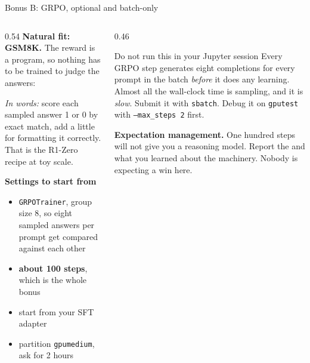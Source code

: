 \documentclass[aspectratio=169,10pt]{beamer}
\begin{document}
\begin{frame}[shrink=14]{Bonus B: GRPO, optional and batch-only}
  \begin{columns}[T]
    \begin{column}{0.54\textwidth}
      \textbf{Natural fit: GSM8K.} The reward is a program, so nothing has to
      be trained to judge the answers:
      \vspace{0.3em}

      \vspace{0.3em}

      \emph{In words:} score each sampled answer 1 or 0 by exact match, add a
      little for formatting it correctly. That is the R1-Zero recipe at toy
      scale.
      \vspace{0.4em}

      \textbf{Settings to start from}
      \begin{itemize}\small
        \item \texttt{GRPOTrainer}, group size 8, so eight sampled answers per
          prompt get compared against each other
        \item \textbf{about 100 steps}, which is the whole bonus
        \item start from your SFT adapter
        \item partition \texttt{gpumedium}, ask for 2 hours
      \end{itemize}
    \end{column}
    \begin{column}{0.46\textwidth}
      \begin{alertblock}{Do not run this in your Jupyter session}
        \small
        Every GRPO step generates eight completions for every prompt in the
        batch \emph{before} it does any learning. Almost all the wall-clock
        time is sampling, and it is \emph{slow}.
        \vspace{0.4em}
        Submit it with \texttt{sbatch}. Debug it on \texttt{gputest} with
        \texttt{--max\_steps 2} first.
      \end{alertblock}
      \vspace{0.4em}
      \small
      \textbf{Expectation management.} One hundred steps will not give you a
      reasoning model. Report the  and what you learned about
      the machinery. Nobody is expecting a win here.
    \end{column}
  \end{columns}
\end{frame}
\end{document}
